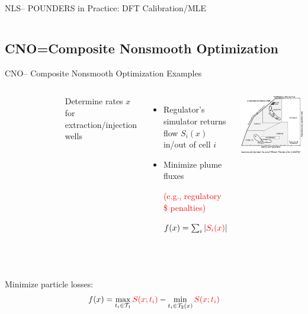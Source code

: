 \documentclass[handout,aspectratio=54]{beamer}
\numberwithin{theorem}{section}
\begin{document}
\begin{frame}{NLS– POUNDERS in Practice: DFT Calibration/MLE}
\begin{columns}
\end{columns}
\end{frame}

\subsection{CNO=Composite Nonsmooth Optimization}
\begin{frame}{CNO– Composite Nonsmooth Optimization Examples}
\begin{columns}
\colorbox[rgb]{0.5,0.6,0.7}{\textcolor{white}{Ex.- Groundwater remediation}}

Determine rates $x$ for extraction/injection wells
\begin{itemize}
\item Regulator’s simulator returns flow $S_i(x)$ in/out of cell $i$
\item Minimize plume fluxes

\textcolor{red}{(e.g., regulatory \$ penalties)}

$f(x)=\sum_i|\textcolor{red}{S_i(x)}|$
\end{itemize}

\includegraphics[width=\textwidth]{fig/48.jpg}
\end{columns}

\vspace{0.2cm}

\colorbox[rgb]{0.5,0.6,0.7}{\textcolor{white}{Ex.- Particle accelerator design}}

\vspace{0.05cm}
Minimize particle losses:
\begin{equation*}
f(x)=\max_{t_i\in\mathcal{T}_1}\textcolor{red}{S(x;t_i)}-\min_{t_i\in\mathcal{T}_2(x)}\textcolor{red}{S(x;t_i)}
\end{equation*}
\end{frame}
\end{document}

